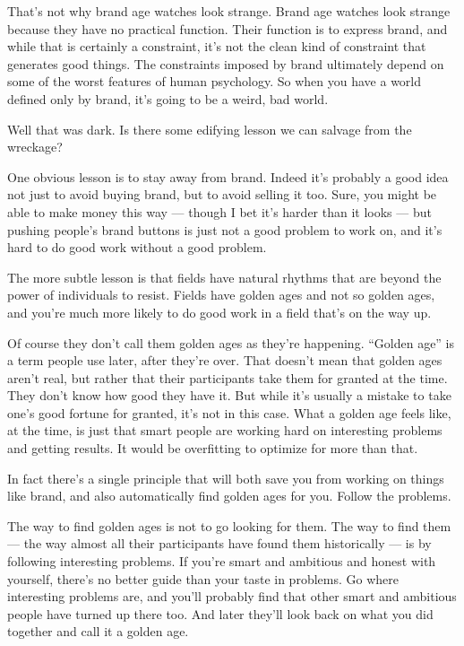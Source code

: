 That's not why brand age watches look strange. Brand age watches look
strange because they have no practical function. Their function is to
express brand, and while that is certainly a constraint, it's not the
clean kind of constraint that generates good things. The constraints
imposed by brand ultimately depend on some of the worst features of
human psychology. So when you have a world defined only by brand, it's
going to be a weird, bad world.

Well that was dark. Is there some edifying lesson we can salvage from
the wreckage?

One obvious lesson is to stay away from brand. Indeed it's probably a
good idea not just to avoid buying brand, but to avoid selling it too.
Sure, you might be able to make money this way --- though I bet it's
harder than it looks --- but pushing people's brand buttons is just not
a good problem to work on, and it's hard to do good work without a good
problem.

The more subtle lesson is that fields have natural rhythms that are
beyond the power of individuals to resist. Fields have golden ages and
not so golden ages, and you're much more likely to do good work in a
field that's on the way up.

Of course they don't call them golden ages as they're happening.
``Golden age'' is a term people use later, after they're over. That
doesn't mean that golden ages aren't real, but rather that their
participants take them for granted at the time. They don't know how good
they have it. But while it's usually a mistake to take one's good
fortune for granted, it's not in this case. What a golden age feels
like, at the time, is just that smart people are working hard on
interesting problems and getting results. It would be overfitting to
optimize for more than that.

In fact there's a single principle that will both save you from working
on things like brand, and also automatically find golden ages for you.
Follow the problems.

The way to find golden ages is not to go looking for them. The way to
find them --- the way almost all their participants have found them
historically --- is by following interesting problems. If you're smart
and ambitious and honest with yourself, there's no better guide than
your taste in problems. Go where interesting problems are, and you'll
probably find that other smart and ambitious people have turned up there
too. And later they'll look back on what you did together and call it a
golden age.

